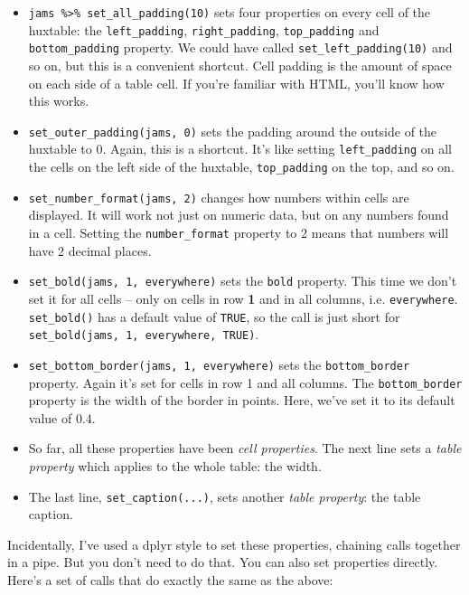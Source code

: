 \documentclass[
]{article}
\providecommand{\tightlist}{%
  \setlength{\itemsep}{0pt}\setlength{\parskip}{0pt}}
\begin{document}
\begin{itemize}
\tightlist
\item
  \texttt{jams\ \%\textgreater{}\%\ set\_all\_padding(10)} sets four
  properties on every cell of the huxtable: the \texttt{left\_padding},
  \texttt{right\_padding}, \texttt{top\_padding} and
  \texttt{bottom\_padding} property. We could have called
  \texttt{set\_left\_padding(10)} and so on, but this is a convenient
  shortcut. Cell padding is the amount of space on each side of a table
  cell. If you're familiar with HTML, you'll know how this works.
\item
  \texttt{set\_outer\_padding(jams,\ 0)} sets the padding around the
  outside of the huxtable to 0. Again, this is a shortcut. It's like
  setting \texttt{left\_padding} on all the cells on the left side of
  the huxtable, \texttt{top\_padding} on the top, and so on.
\item
  \texttt{set\_number\_format(jams,\ 2)} changes how numbers within
  cells are displayed. It will work not just on numeric data, but on any
  numbers found in a cell. Setting the \texttt{number\_format} property
  to 2 means that numbers will have 2 decimal places.
\item
  \texttt{set\_bold(jams,\ 1,\ everywhere)} sets the \texttt{bold}
  property. This time we don't set it for all cells -- only on cells in
  row \textbf{1} and in all columns, i.e. \texttt{everywhere}.
  \texttt{set\_bold()} has a default value of \texttt{TRUE}, so the call
  is just short for \texttt{set\_bold(jams,\ 1,\ everywhere,\ TRUE)}.
\item
  \texttt{set\_bottom\_border(jams,\ 1,\ everywhere)} sets the
  \texttt{bottom\_border} property. Again it's set for cells in row 1
  and all columns. The \texttt{bottom\_border} property is the width of
  the border in points. Here, we've set it to its default value of 0.4.
\item
  So far, all these properties have been \emph{cell properties}. The
  next line sets a \emph{table property} which applies to the whole
  table: the width.
\item
  The last line, \texttt{set\_caption(...)}, sets another \emph{table
  property}: the table caption.
\end{itemize}

Incidentally, I've used a dplyr style to set these properties, chaining
calls together in a pipe. But you don't need to do that. You can also
set properties directly. Here's a set of calls that do exactly the same
as the above:
\end{document}
